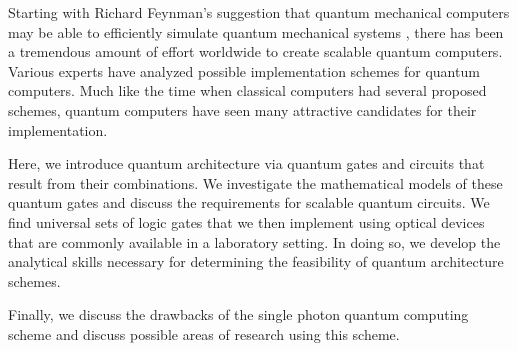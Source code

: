 Starting with Richard Feynman's suggestion that quantum mechanical computers may be able to efficiently simulate quantum mechanical systems \cite{historyofqc}, there has been a tremendous amount of effort worldwide to create scalable quantum computers. Various experts have analyzed possible implementation schemes for quantum computers. Much like the time when classical computers had several proposed schemes, quantum computers have seen many attractive candidates for their implementation.

Here, we introduce quantum architecture via quantum gates and circuits that result from their combinations. We investigate the mathematical models of these quantum gates and discuss the requirements for scalable quantum circuits. We find universal sets of logic gates that we then implement using optical devices that are commonly available in a laboratory setting. In doing so, we develop the analytical skills necessary for determining the feasibility of quantum architecture schemes. 

Finally, we discuss the drawbacks of the single photon quantum computing scheme and discuss possible areas of research using this scheme.
